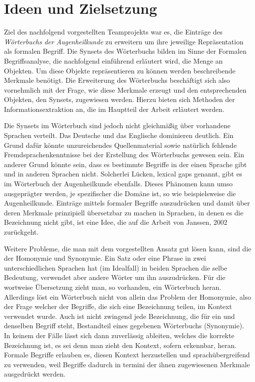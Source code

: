 \documentclass[pagesize,DIV=calc,12pt,draft]{scrreprt}
\begin{document}
\section{Ideen und Zielsetzung}

Ziel des nachfolgend vorgestellten Teamprojekts war es, die Einträge des \emph{Wörterbuchs der Augenheilkunde} zu erweitern um ihre jeweilige Repräsentation als formalen Begriff. 
Die Synsets des Wörterbuchs bilden im Sinne der Formalen Begriffsanalyse, die nachfolgend einführend erläutert wird, die Menge an Objekten. 
Um diese Objekte repräsentieren zu können werden beschreibende Merkmale benötigt. 
Die Erweiterung des Wörterbuchs beschäftigt sich also vornehmlich mit der Frage, wie diese Merkmale erzeugt und den entsprechenden Objekten, den Synsets, zugewiesen werden. 
Hierzu bieten sich Methoden der Informationsextraktion an, die im Hauptteil der Arbeit erläutert werden. 

Die Synsets im Wörterbuch sind jedoch nicht gleichmäßig über vorhandene Sprachen verteilt. 
Das Deutsche und das Englische dominieren deutlich. 
Ein Grund dafür könnte unzureichendes Quellenmaterial sowie natürlich fehlende Fremdsprachenkenntnisse bei der Erstellung des Wörterbuchs gewesen sein. 
Ein anderer Grund könnte sein, dass es bestimmte Begriffe in der einen Sprache gibt und in anderen Sprachen nicht. 
Solcherlei Lücken, lexical gaps genannt, gibt es im Wörterbuch der Augenheilkunde ebenfalls. 
Dieses Phänomen kann umso ausgeprägter werden, je spezifischer die Domäne ist, so wie beispielsweise die Augenheilkunde. 
Einträge mittels formaler Begriffe auszudrücken und damit über deren Merkmale prinzipiell übersetzbar zu machen in Sprachen, in denen es die Bezeichnung nicht gibt, ist eine Idee, die auf die Arbeit von Janssen, 2002 zurückgeht. 

Weitere Probleme, die man mit dem vorgestellten Ansatz gut lösen kann, sind die der Homonymie und Synonymie. 
Ein Satz oder eine Phrase in zwei unterschiedlichen Sprachen hat (im Idealfall) in beiden Sprachen die selbe Bedeutung, verwendet aber andere Wörter um ihn auszudrücken. 
Für die wortweise Übersetzung zieht man, so vorhanden, ein Wörterbuch heran. 
Allerdings löst ein Wörterbuch nicht von allein das Problem der Homonymie, also der Frage welcher der Begriffe, die sich eine Bezeichnung teilen, im Kontext verwendet wurde. 
Auch ist nicht zwingend jede Bezeichnung, die für ein und denselben Begriff steht, Bestandteil eines gegebenen Wörterbuchs (Synonymie). 
In keinem der Fälle lässt sich dann zuverlässig ableiten, welches die korrekte Bezeichnung ist, es sei denn man zieht den Kontext, sofern erkennbar, heran. 
Formale Begriffe erlauben es, diesen Kontext herzustellen und sprachübergreifend zu verwenden, weil Begriffe dadurch in termini der ihnen zugewiesenen Merkmale ausgedrückt werden. 
\end{document}
